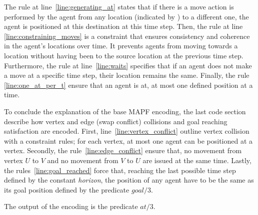 The rule at line~\ref{line:generating_at} states that if there is a move action is performed by the agent from any location (indicated by \textunderscore) to a different one, the agent is positioned at this destination at this time step.
Then, the rule at line \ref{line:constraining_moves} is a constraint that ensures consistency and coherence in the agent's locations over time. It prevents agents from moving towards a location without having been to the source location at the previous time step. 
Furthermore, the rule at line~\ref{line:waits} specifies that if an agent does not make a move at a specific time step, their location remains the same. 
Finally, the rule \ref{line:one_at_per_t} ensure that an agent is at, at most one defined position at a time.



To conclude the explanation of the base MAPF encoding, the last code section describe how vertex and edge (swap conflict) collisions and goal reaching satisfaction are encoded. First, line~\ref{line:vertex_conflict} outline vertex collision with a constraint rules;  for each vertex, at most one agent can be positioned at a vertex.
Secondly, the rule~\ref{line:edge_conflict} ensure that, no movement from vertex \(U\) to \(V\) and no movement from \(V\) to \(U\) are issued at the same time.
Lastly, the rules~\ref{line:goal_reached} force that, reaching the last possible time step defined by the constant \textit{horizon}, the position of any agent have to be the same as its goal position defined by the predicate \(goal/3\). 

The output of the encoding is the predicate \(at/3\). 
